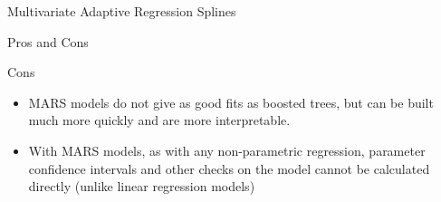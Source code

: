 \documentclass[ignorenonframetext,]{beamer}
\providecommand{\tightlist}{%
  \setlength{\itemsep}{0pt}\setlength{\parskip}{0pt}}
\begin{document}
\begin{frame}{Multivariate Adaptive Regression Splines}
\begin{block}{Pros and Cons}
\begin{block}{Cons}

\begin{itemize}
\tightlist
\item
  MARS models do not give as good fits as boosted trees, but can be
  built much more quickly and are more interpretable.
\item
  With MARS models, as with any non-parametric regression, parameter
  confidence intervals and other checks on the model cannot be
  calculated directly (unlike linear regression models)
\end{itemize}

\end{block}

\end{block}

\end{frame}
\end{document}
